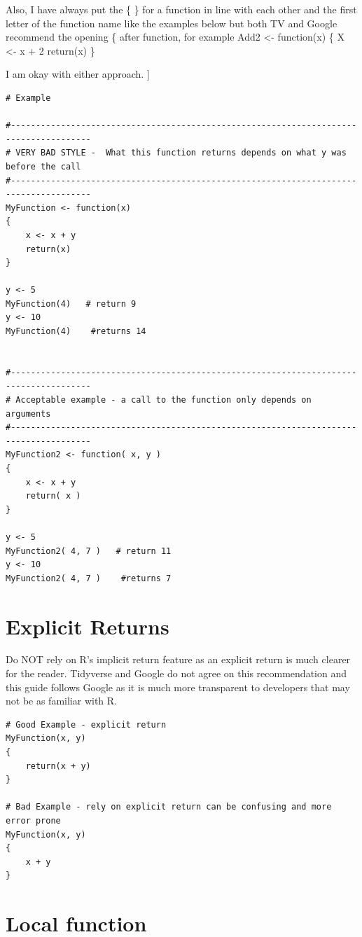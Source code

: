 \documentclass[
]{book}
\begin{document}
Also, I have always put the \{ \} for a function in line with each other and the first letter of the function name like the examples below but both TV and Google recommend the opening \{ after function, for example
Add2 \textless- function(x) \{
X \textless- x + 2
return(x)
\}

I am okay with either approach. {]}

\begin{verbatim}
# Example

#--------------------------------------------------------------------------------------
# VERY BAD STYLE -  What this function returns depends on what y was before the call
#--------------------------------------------------------------------------------------
MyFunction <- function(x)
{
    x <- x + y
    return(x)
}

y <- 5
MyFunction(4)   # return 9
y <- 10
MyFunction(4)    #returns 14


#--------------------------------------------------------------------------------------
# Acceptable example - a call to the function only depends on arguments
#--------------------------------------------------------------------------------------
MyFunction2 <- function( x, y )
{
    x <- x + y
    return( x )
}

y <- 5
MyFunction2( 4, 7 )   # return 11
y <- 10
MyFunction2( 4, 7 )    #returns 7
\end{verbatim}

\hypertarget{explicit-returns}{%
\section{Explicit Returns}\label{explicit-returns}}

Do NOT rely on R's implicit return feature as an explicit return is much clearer for the reader. Tidyverse and Google do not agree on this recommendation and this guide follows Google as it is much more transparent to developers that may not be as familiar with R.

\begin{verbatim}
# Good Example - explicit return
MyFunction(x, y)
{
    return(x + y)
}

# Bad Example - rely on explicit return can be confusing and more error prone
MyFunction(x, y)
{
    x + y
}
\end{verbatim}

\hypertarget{local-function}{%
\section{Local function}\label{local-function}}
\end{document}
